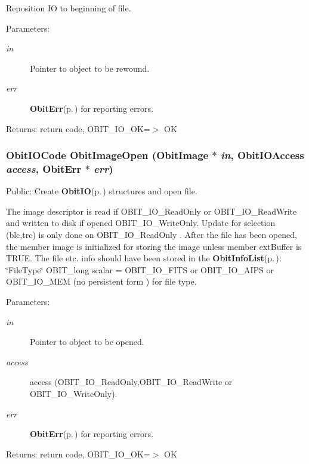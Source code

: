 Reposition IO to beginning of file. 

\begin{Desc}
\item[Parameters:]
\begin{description}
\item[{\em in}]Pointer to object to be rewound. \item[{\em err}]{\bf Obit\-Err}{\rm (p.\,\pageref{structObitErr})} for reporting errors. \end{description}
\end{Desc}
\begin{Desc}
\item[Returns:]return code, OBIT\_\-IO\_\-OK=$>$ OK \end{Desc}
\subsubsection{\setlength{\rightskip}{0pt plus 5cm}Obit\-IOCode Obit\-Image\-Open ({\bf Obit\-Image} $\ast$ {\em in}, Obit\-IOAccess {\em access}, {\bf Obit\-Err} $\ast$ {\em err})}\label{ObitImage_8c_a20}


Public: Create {\bf Obit\-IO}{\rm (p.\,\pageref{structObitIO})} structures and open file. 

The image descriptor is read if OBIT\_\-IO\_\-Read\-Only or OBIT\_\-IO\_\-Read\-Write and written to disk if opened OBIT\_\-IO\_\-Write\-Only. Update for selection (blc,trc) is only done on OBIT\_\-IO\_\-Read\-Only . After the file has been opened, the member image is initialized for storing the image unless member ext\-Buffer is TRUE. The file etc. info should have been stored in the {\bf Obit\-Info\-List}{\rm (p.\,\pageref{structObitInfoList})}: \char`\"{}File\-Type\char`\"{} OBIT\_\-long scalar = OBIT\_\-IO\_\-FITS or OBIT\_\-IO\_\-AIPS or OBIT\_\-IO\_\-MEM (no persistent form ) for file type. \begin{Desc}
\item[Parameters:]
\begin{description}
\item[{\em in}]Pointer to object to be opened. \item[{\em access}]access (OBIT\_\-IO\_\-Read\-Only,OBIT\_\-IO\_\-Read\-Write or OBIT\_\-IO\_\-Write\-Only). \item[{\em err}]{\bf Obit\-Err}{\rm (p.\,\pageref{structObitErr})} for reporting errors. \end{description}
\end{Desc}
\begin{Desc}
\item[Returns:]return code, OBIT\_\-IO\_\-OK=$>$ OK \end{Desc}
